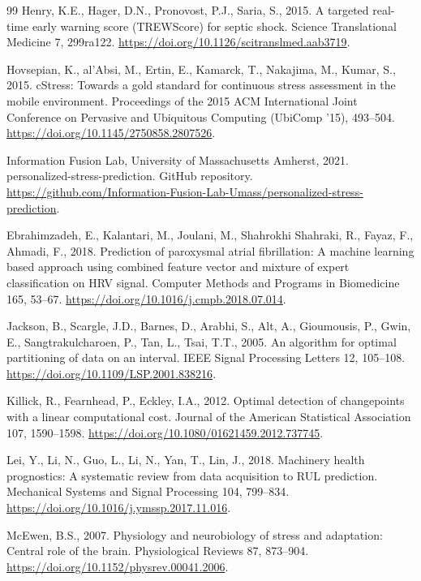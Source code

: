 \documentclass[preprint,12pt,authoryear]{elsarticle}
\begin{document}
\begin{thebibliography}{99}
Henry, K.E., Hager, D.N., Pronovost, P.J., Saria, S., 2015.
A targeted real-time early warning score (TREWScore) for septic shock.
Science Translational Medicine 7, 299ra122.
\url{https://doi.org/10.1126/scitranslmed.aab3719}.

Hovsepian, K., al'Absi, M., Ertin, E., Kamarck, T., Nakajima, M.,
Kumar, S., 2015.
cStress: Towards a gold standard for continuous stress assessment in
the mobile environment.
Proceedings of the 2015 ACM International Joint Conference on Pervasive
and Ubiquitous Computing (UbiComp '15), 493--504.
\url{https://doi.org/10.1145/2750858.2807526}.

Information Fusion Lab, University of Massachusetts Amherst, 2021.
personalized-stress-prediction. GitHub repository.
\url{https://github.com/Information-Fusion-Lab-Umass/personalized-stress-prediction}.

Ebrahimzadeh, E., Kalantari, M., Joulani, M., Shahrokhi Shahraki, R.,
Fayaz, F., Ahmadi, F., 2018.
Prediction of paroxysmal atrial fibrillation: A machine learning based
approach using combined feature vector and mixture of expert
classification on HRV signal.
Computer Methods and Programs in Biomedicine 165, 53--67.
\url{https://doi.org/10.1016/j.cmpb.2018.07.014}.

Jackson, B., Scargle, J.D., Barnes, D., Arabhi, S., Alt, A.,
Gioumousis, P., Gwin, E., Sangtrakulcharoen, P., Tan, L., Tsai, T.T.,
2005.
An algorithm for optimal partitioning of data on an interval.
IEEE Signal Processing Letters 12, 105--108.
\url{https://doi.org/10.1109/LSP.2001.838216}.

Killick, R., Fearnhead, P., Eckley, I.A., 2012.
Optimal detection of changepoints with a linear computational cost.
Journal of the American Statistical Association 107, 1590--1598.
\url{https://doi.org/10.1080/01621459.2012.737745}.

Lei, Y., Li, N., Guo, L., Li, N., Yan, T., Lin, J., 2018.
Machinery health prognostics: A systematic review from data acquisition
to RUL prediction.
Mechanical Systems and Signal Processing 104, 799--834.
\url{https://doi.org/10.1016/j.ymssp.2017.11.016}.

McEwen, B.S., 2007.
Physiology and neurobiology of stress and adaptation: Central role of
the brain.
Physiological Reviews 87, 873--904.
\url{https://doi.org/10.1152/physrev.00041.2006}.


\end{thebibliography}
\end{document}
